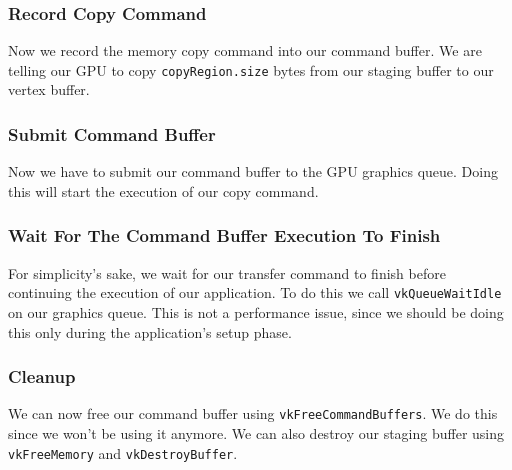 \subsubsection{Record Copy Command}

Now we record the memory copy command into our command buffer.
We are telling our GPU to copy \texttt{copyRegion.size} bytes
from our staging buffer to our vertex buffer.

\begin{minipage}{\linewidth}{\noindent}
    
\end{minipage}

\subsubsection{Submit Command Buffer}

Now we have to submit our command buffer to the GPU graphics queue.
Doing this will start the execution of our copy command.

\begin{minipage}{\linewidth}{\noindent}
    
\end{minipage}

\subsubsection{Wait For The Command Buffer Execution To Finish}

For simplicity's sake, we wait for our transfer command to finish
before continuing the execution of our application.
To do this we call \texttt{vkQueueWaitIdle} on our graphics queue.
This is not a performance issue, since we should be doing this
only during the application's setup phase.

\subsubsection{Cleanup}

We can now free our command buffer using \texttt{vkFreeCommandBuffers}.
We do this since we won't be using it anymore.
We can also destroy our staging buffer using \texttt{vkFreeMemory}
and \texttt{vkDestroyBuffer}.


